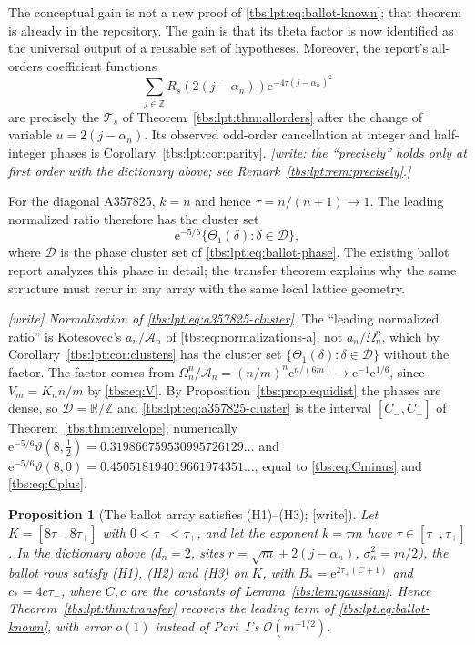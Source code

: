 \documentclass[11pt,a4paper]{article}
\numberwithin{equation}{section}
\newtheorem{proposition}[theorem]{Proposition}
\theoremstyle{definition}
\newcommand{\Z}{\mathbb Z}
\newcommand{\R}{\mathbb R}
\newcommand{\Acal}{\mathcal A}
\newcommand{\ee}{\mathrm e}
\newcommand{\OO}{\mathcal O}
\begin{document}
The conceptual gain is not a new proof of
\eqref{tbs:lpt:eq:ballot-known}; that theorem is already in the
repository. The gain is that its theta factor is now identified as the
universal output of a reusable set of hypotheses. Moreover, the report's
all-orders coefficient functions
\[
 \sum_{j\in\Z}R_s(2(j-\alpha_n))\ee^{-4\tau(j-\alpha_n)^2}
\]
are precisely the $\mathcal T_s$ of Theorem~\ref{tbs:lpt:thm:allorders}
after the change of variable $u=2(j-\alpha_n)$. Its observed odd-order
cancellation at integer and half-integer phases is
Corollary~\ref{tbs:lpt:cor:parity}. \emph{[write: the ``precisely'' holds
only at first order with the dictionary above; see
Remark~\ref{tbs:lpt:rem:precisely}.]}

For the diagonal A357825, $k=n$ and hence $\tau=n/(n+1)\to1$. The leading
normalized ratio therefore has the cluster set
\begin{equation}\label{tbs:lpt:eq:a357825-cluster}
 \ee^{-5/6}\{\Theta_1(\delta):\delta\in\mathcal D\},
\end{equation}
where $\mathcal D$ is the phase cluster set of
\eqref{tbs:lpt:eq:ballot-phase}. The existing ballot report analyzes this
phase in detail; the transfer theorem explains why the same structure
must recur in any array with the same local lattice geometry.

\emph{[write] Normalization of \eqref{tbs:lpt:eq:a357825-cluster}.} The
``leading normalized ratio'' is Kotesovec's $a_n/\Acal_n$ of
\eqref{tbs:eq:normalizations-a}, not $a_n/\Omega_n^n$, which by
Corollary~\ref{tbs:lpt:cor:clusters} has the cluster set
$\{\Theta_1(\delta):\delta\in\mathcal D\}$ without the factor. The factor
comes from $\Omega_n^n/\Acal_n=(n/m)^n\ee^{n/(6m)}\to\ee^{-1}\ee^{1/6}$,
since $V_m=K_nn/m$ by \eqref{tbs:eq:V}. By
Proposition~\ref{tbs:prop:equidist} the phases are dense, so
$\mathcal D=\R/\Z$ and \eqref{tbs:lpt:eq:a357825-cluster} is the interval
$[C_-,C_+]$ of Theorem~\ref{tbs:thm:envelope}; numerically
$\ee^{-5/6}\vartheta(8,\tfrac12)=0.319866759530995726129\ldots$ and
$\ee^{-5/6}\vartheta(8,0)=0.450518194019661974351\ldots$, equal to
\eqref{tbs:eq:Cminus} and \eqref{tbs:eq:Cplus}.

\begin{proposition}[The ballot array satisfies (H1)--(H3); {[write]}]\label{tbs:lpt:prop:ballot}
Let $K=[8\tau_-,8\tau_+]$ with $0<\tau_-<\tau_+$, and let the exponent
$k=\tau m$ have $\tau\in[\tau_-,\tau_+]$. In the dictionary above
($d_n=2$, sites $r=\sqrt m+2(j-\alpha_n)$, $\sigma_n^2=m/2$), the ballot
rows satisfy (H1), (H2) and (H3) on $K$, with
$B_*=\ee^{2\tau_+(C+1)}$ and $c_*=4c\tau_-$, where $C,c$ are the
constants of Lemma~\ref{tbs:lem:gaussian}. Hence
Theorem~\ref{tbs:lpt:thm:transfer} recovers the leading term of
\eqref{tbs:lpt:eq:ballot-known}, with error $o(1)$ instead of Part~I's
$\OO(m^{-1/2})$.
\end{proposition}
\end{document}
